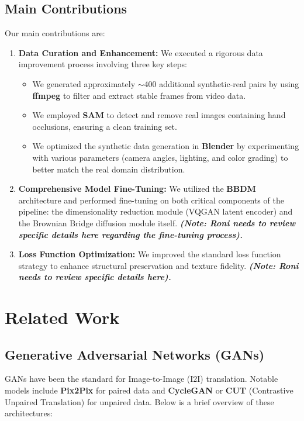 \documentclass[12pt,a4paper]{article}
\begin{document}
\subsection{Main Contributions}
Our main contributions are:
\begin{enumerate}
    \item \textbf{Data Curation and Enhancement:} We executed a rigorous data improvement process involving three key steps:
    \begin{itemize}
        \item We generated approximately $\sim$400 additional synthetic-real pairs by using \textbf{ffmpeg} to filter and extract stable frames from video data.
        \item We employed \textbf{SAM} \cite{sam2023} to detect and remove real images containing hand occlusions, ensuring a clean training set.
        \item We optimized the synthetic data generation in \textbf{Blender} by experimenting with various parameters (camera angles, lighting, and color grading) to better match the real domain distribution.
    \end{itemize}
    
    \item \textbf{Comprehensive Model Fine-Tuning:} We utilized the \textbf{BBDM} \cite{bbdm2023} architecture and performed fine-tuning on both critical components of the pipeline: the dimensionality reduction module (VQGAN latent encoder) and the Brownian Bridge diffusion module itself. \textit{\textbf{(Note: Roni needs to review specific details here regarding the fine-tuning process).}}

    \item \textbf{Loss Function Optimization:} We improved the standard loss function strategy to enhance structural preservation and texture fidelity. \textit{\textbf{(Note: Roni needs to review specific details here).}}
\end{enumerate}

\section{Related Work}
\label{sec:related}

\subsection{Generative Adversarial Networks (GANs)}
GANs have been the standard for Image-to-Image (I2I) translation. Notable models include \textbf{Pix2Pix} for paired data and \textbf{CycleGAN} \cite{cyclegan2017} or \textbf{CUT} (Contrastive Unpaired Translation) \cite{cut2020} for unpaired data. Below is a brief overview of these architectures:
\end{document}
